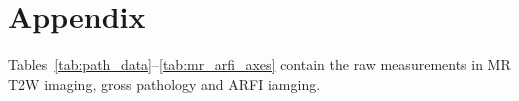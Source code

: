 \section{Appendix}\label{sect:appendix}

Tables~\ref{tab:path_data}--\ref{tab:mr_arfi_axes} contain the raw measurements in 
MR T2W imaging, gross pathology and ARFI iamging.



\clearpage


\clearpage

